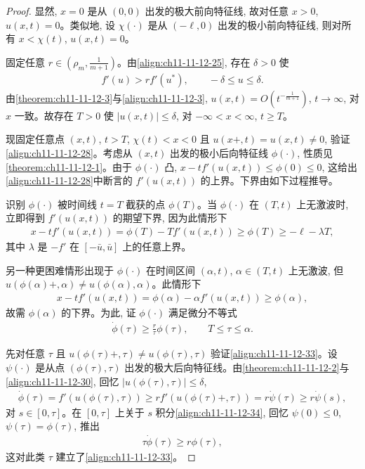 \documentclass[../../main.tex]{subfiles}
\begin{document}
\begin{proof}
显然, $x=0$ 是从 $(0,0)$ 出发的极大前向特征线, 故对任意 $x>0$, $u(x,t)=0$。类似地, 设 $\chi(\cdot)$ 是从 $(-\ell,0)$ 出发的极小前向特征线, 则对所有 $x<\chi(t)$, $u(x,t)=0$。

固定任意 $r\in(\rho_m,\frac{1}{m+1})$。由\eqref{align:ch11-11-12-25}, 存在 $\delta>0$ 使
\begin{align}
f'(u)>r f'(u^*),\qquad -\delta\leqslant u\leqslant\delta.\label{align:ch11-11-12-30}
\end{align}
由\cref{theorem:ch11-11-12-3}与\eqref{align:ch11-11-12-3}, $u(x,t)=O(t^{-\frac{1}{m+1}})$, $t\to\infty$, 对 $x$ 一致。故存在 $T>0$ 使 $|u(x,t)|\leqslant\delta$, 对 $-\infty<x<\infty$, $t\geqslant T$。

现固定任意点 $(x,t)$, $t>T$, $\chi(t)<x<0$ 且 $u(x+,t)=u(x,t)\neq0$, 验证\eqref{align:ch11-11-12-28}。考虑从 $(x,t)$ 出发的极小后向特征线 $\phi(\cdot)$, 性质见\cref{theorem:ch11-11-12-1}。由于 $\phi(\cdot)$ 凸, $x-tf'(u(x,t))\leqslant\phi(0)\leqslant0$, 这给出\eqref{align:ch11-11-12-28}中断言的 $f'(u(x,t))$ 的上界。下界由如下过程推导。

识别 $\phi(\cdot)$ 被时间线 $t=T$ 截获的点 $\phi(T)$。当 $\phi(\cdot)$ 在 $(T,t)$ 上无激波时, 立即得到 $f'(u(x,t))$ 的期望下界, 因为此情形下
\begin{align}
x-tf'(u(x,t))=\phi(T)-Tf'(u(x,t))\geqslant\phi(T)\geqslant-\ell-\lambda T,\label{align:ch11-11-12-31}
\end{align}
其中 $\lambda$ 是 $-f'$ 在 $[-\bar u,\bar u]$ 上的任意上界。

另一种更困难情形出现于 $\phi(\cdot)$ 在时间区间 $(\alpha,t)$, $\alpha\in(T,t)$ 上无激波, 但 $u(\phi(\alpha)+,\alpha)\neq u(\phi(\alpha),\alpha)$。此情形下
\begin{align}
x-tf'(u(x,t))=\phi(\alpha)-\alpha f'(u(x,t))\geqslant\phi(\alpha),\label{align:ch11-11-12-32}
\end{align}
故需 $\phi(\alpha)$ 的下界。为此, 证 $\phi(\cdot)$ 满足微分不等式
\begin{align}
\dot{\phi}(\tau)\geqslant\frac{r}{\tau}\phi(\tau),\qquad T\leqslant\tau\leqslant\alpha.\label{align:ch11-11-12-33}
\end{align}

先对任意 $\tau$ 且 $u(\phi(\tau)+,\tau)\neq u(\phi(\tau),\tau)$ 验证\eqref{align:ch11-11-12-33}。设 $\psi(\cdot)$ 是从点 $(\phi(\tau),\tau)$ 出发的极大后向特征线。由\cref{theorem:ch11-11-12-2}与\eqref{align:ch11-11-12-30}, 回忆 $|u(\phi(\tau),\tau)|\leqslant\delta$,
\begin{align}
\dot{\phi}(\tau)=f'(u(\phi(\tau),\tau))\geqslant r f'(u(\phi(\tau)+,\tau))=r\dot{\psi}(\tau)\geqslant r\dot{\psi}(s),\label{align:ch11-11-12-34}
\end{align}
对 $s\in[0,\tau]$。在 $[0,\tau]$ 上关于 $s$ 积分\eqref{align:ch11-11-12-34}, 回忆 $\psi(0)\leqslant0$, $\psi(\tau)=\phi(\tau)$, 推出
\begin{align}
\tau\dot{\phi}(\tau)\geqslant r\phi(\tau),\label{align:ch11-11-12-35}
\end{align}
这对此类 $\tau$ 建立了\eqref{align:ch11-11-12-33}。


\end{proof}
\end{document}
